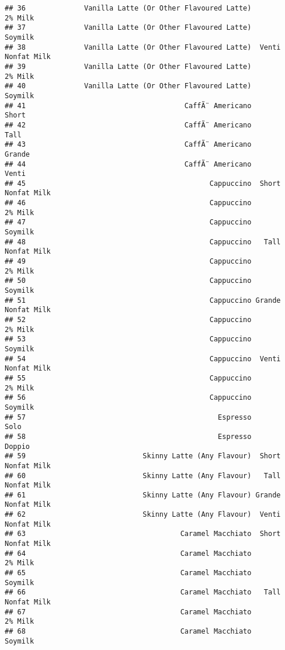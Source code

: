 \documentclass[
]{article}
\begin{document}
\begin{verbatim}
## 36              Vanilla Latte (Or Other Flavoured Latte)            2% Milk
## 37              Vanilla Latte (Or Other Flavoured Latte)            Soymilk
## 38              Vanilla Latte (Or Other Flavoured Latte)  Venti Nonfat Milk
## 39              Vanilla Latte (Or Other Flavoured Latte)            2% Milk
## 40              Vanilla Latte (Or Other Flavoured Latte)            Soymilk
## 41                                      CaffÃ¨ Americano              Short
## 42                                      CaffÃ¨ Americano               Tall
## 43                                      CaffÃ¨ Americano             Grande
## 44                                      CaffÃ¨ Americano              Venti
## 45                                            Cappuccino  Short Nonfat Milk
## 46                                            Cappuccino            2% Milk
## 47                                            Cappuccino            Soymilk
## 48                                            Cappuccino   Tall Nonfat Milk
## 49                                            Cappuccino            2% Milk
## 50                                            Cappuccino            Soymilk
## 51                                            Cappuccino Grande Nonfat Milk
## 52                                            Cappuccino            2% Milk
## 53                                            Cappuccino            Soymilk
## 54                                            Cappuccino  Venti Nonfat Milk
## 55                                            Cappuccino            2% Milk
## 56                                            Cappuccino            Soymilk
## 57                                              Espresso               Solo
## 58                                              Espresso             Doppio
## 59                            Skinny Latte (Any Flavour)  Short Nonfat Milk
## 60                            Skinny Latte (Any Flavour)   Tall Nonfat Milk
## 61                            Skinny Latte (Any Flavour) Grande Nonfat Milk
## 62                            Skinny Latte (Any Flavour)  Venti Nonfat Milk
## 63                                     Caramel Macchiato  Short Nonfat Milk
## 64                                     Caramel Macchiato            2% Milk
## 65                                     Caramel Macchiato            Soymilk
## 66                                     Caramel Macchiato   Tall Nonfat Milk
## 67                                     Caramel Macchiato            2% Milk
## 68                                     Caramel Macchiato            Soymilk

\end{verbatim}
\end{document}
